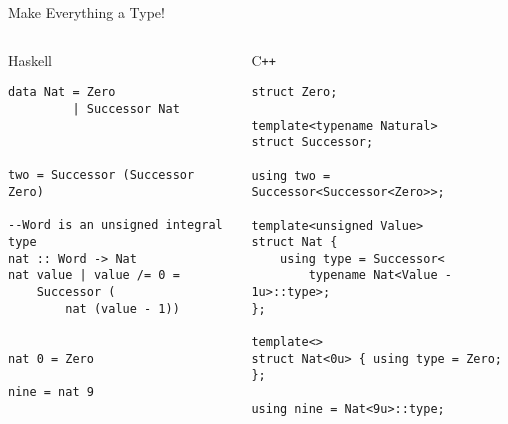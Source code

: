 \documentclass[aspectratio=169]{beamer}
\begin{document}
\begin{frame}[fragile]{Make Everything a Type!}
    
    \addtocounter{framenumber}{-1}
\begin{columns}[t] 
        \begin{column}{0.5\textwidth}
            \scriptsize
            \begin{block}{Haskell}
                \begin{verbatim}
data Nat = Zero
         | Successor Nat 



two = Successor (Successor Zero)

--Word is an unsigned integral type
nat :: Word -> Nat 
nat value | value /= 0 = 
    Successor (
        nat (value - 1))
    

nat 0 = Zero

nine = nat 9
                \end{verbatim}
            \end{block}
        \end{column}

        \begin{column}{0.5\textwidth}
            \scriptsize
            \begin{block}{C\texttt{++}}
                \begin{verbatim}
struct Zero;

template<typename Natural>
struct Successor;

using two = Successor<Successor<Zero>>;

template<unsigned Value>
struct Nat { 
    using type = Successor<
        typename Nat<Value - 1u>::type>; 
};

template<>
struct Nat<0u> { using type = Zero; };

using nine = Nat<9u>::type;
                \end{verbatim}
            \end{block}
        \end{column}
\end{columns}

\end{frame}

\end{document}
